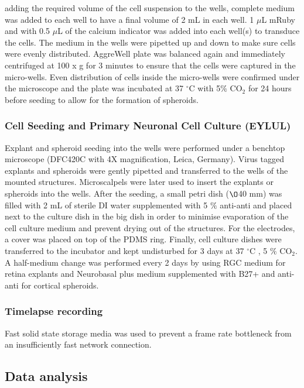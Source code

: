 adding the required volume of the cell suspension to the wells, complete medium
was added to each well to have a final volume of 2 mL in each well. 1 $\mu$L
mRuby and with 0.5 $\mu$L of the calcium indicator was added into each well(s)
to transduce the cells. The medium in the wells were pipetted up and down to
make sure cells were evenly distributed.
AggreWell\textsuperscript{\texttrademark} plate was balanced again and
immediately centrifuged at 100 x g for 3 minutes to ensure that the cells were
captured in the micro-wells. Even distribution of cells inside the micro-wells
were confirmed under the microscope and the plate was incubated at 37
$^{\circ}$C with 5$\%$ CO$_{2}$ for 24 hours before seeding to allow for the
formation of spheroids. 

\subsubsection{Cell Seeding and Primary Neuronal Cell Culture (EYLUL)}
Explant and spheroid seeding into the wells were performed under a benchtop
microscope (DFC420C with 4X magnification, Leica, Germany). Virus tagged
explants and spheroids were gently pipetted and transferred to the wells of the
mounted structures. Microscalpels were later used to insert the explants or
spheroids into the wells. After the seeding, a small petri dish ($\O$40 mm) was
filled with 2 mL of sterile DI water supplemented with 5 $\%$ anti-anti and
placed next to the culture dish in the big dish in order to minimise evaporation
of the cell culture medium and prevent drying out of the structures. For the
electrodes, a cover was placed on top of the PDMS ring. Finally, cell culture
dishes were transferred to the incubator and kept undisturbed for 3 days at 37
$^{\circ}$C , 5 $\%$ CO$_{2}$. A half-medium change was performed every 2 days
by using RGC medium for retina explants and Neurobasal plus medium supplemented
with B27+ and anti-anti for cortical spheroids.

\subsubsection{Timelapse recording}
Fast solid state storage media was used to prevent a frame rate bottleneck from 
an insufficiently fast network connection.










\subsection{Data analysis}
